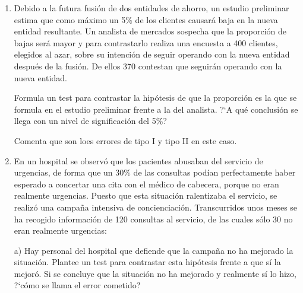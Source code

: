 \begin{adjustwidth}{20pt}{10pt}
\begin{enumerate}[PB. 1. ]
\item Debido a la futura fusión de dos entidades de ahorro, un estudio preliminar estima que como máximo un 5\% de los clientes causará baja en la nueva entidad resultante. Un analista de mercados sospecha que la proporción de bajas será mayor y para contrastarlo realiza una encuesta a 400 clientes, elegidos al azar, sobre su intención de seguir operando con la nueva entidad después de la fusión. De ellos 370 contestan que seguirán operando con la nueva entidad.

Formula un test para contrastar la hipótesis de que la proporción es la que se formula en el estudio preliminar frente a la del analista. ?`A qué conclusión se llega con un nivel de significación del 5\%? 

Comenta que son loes errores de tipo I y tipo II en este caso.

\hspace{-15mm}

\hspace{-15mm}

\hspace{-15mm}

\hspace{-15mm}

\hspace{-15mm}\vspace{1cm}



\item En un hospital se observó que los pacientes abusaban del servicio de urgencias, de forma que un 30\% de las consultas podían perfectamente haber esperado a concertar una cita con el médico de cabecera, porque no eran realmente urgencias. Puesto que esta situación ralentizaba el servicio, se realizó una campaña intensiva de concienciación. Transcurridos unos meses se ha recogido información de 120 consultas al servicio, de las cuales sólo 30 no eran realmente urgencias:

a) Hay personal del hospital que defiende que la campaña no ha mejorado la situación. Plantee un test para contrastar esta hipótesis frente a que sí la mejoró. Si se concluye que la situación no ha mejorado y realmente sí lo hizo, ?`cómo se llama el error cometido?


\end{enumerate}
\end{adjustwidth}
